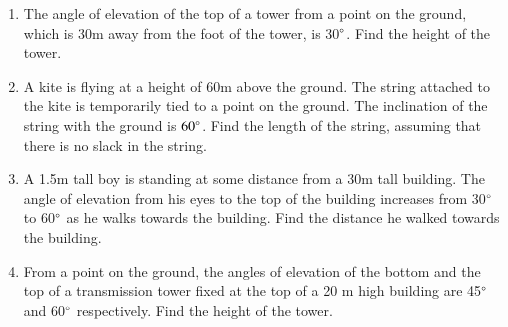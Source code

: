 \begin{enumerate}[label=\arabic*.,ref=\thesubsection.\theenumi]
%
\item The angle of elevation of the top of a tower from a point on the ground, which is 30m away from the foot of the tower, is 30$\degree$.  Find the height of the tower.
%
\item A kite is flying at a height of 60m above the ground.  The string attached to the kite is temporarily tied to a point on the ground.  The inclination of the string with the ground is $60\degree$.  Find the length of the string, assuming that there is no slack in the string.
%
\item A 1.5m tall boy is standing at some distance from a 30m tall building.  The angle of elevation from his eyes to the top of the building increases from 30$\degree$
 to 60$\degree $ as he walks towards the building.  Find the distance he walked towards the building.

\item From a point on the ground, the angles of elevation of the bottom and the top of a transmission tower fixed at the top of a 20 m high building are 45$\degree$ and 60$\degree$ respectively. Find the height of the tower.


\end{enumerate}

